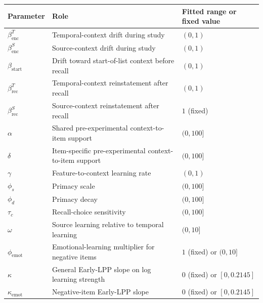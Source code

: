 \documentclass[
  man,
  longtable,
  nolmodern,
  notxfonts,
  notimes,
  draftfirst,
  colorlinks=true,linkcolor=blue,citecolor=blue,urlcolor=blue]{apa7}
\begin{document}
\begin{table}

{\caption{{Parameters in the six-model
specification.}{\label{tbl-model-parameter-spec}}}
\vspace{-20pt}}

\begin{longtable}[]{@{}
  >{\raggedright\arraybackslash}p{}
  >{\raggedright\arraybackslash}p{}
  >{\raggedright\arraybackslash}p{}@{}}
\toprule\noalign{}
\begin{minipage}[b]{\linewidth}\raggedright
Parameter
\end{minipage} & \begin{minipage}[b]{\linewidth}\raggedright
Role
\end{minipage} & \begin{minipage}[b]{\linewidth}\raggedright
Fitted range or fixed value
\end{minipage} \\
\midrule\noalign{}
\endhead
\bottomrule\noalign{}
\endlastfoot
\(\beta_{\mathrm{enc}}^T\) & Temporal-context drift during study &
\((0,1)\) \\
\(\beta_{\mathrm{enc}}^S\) & Source-context drift during study &
\((0,1)\) \\
\(\beta_{\mathrm{start}}\) & Drift toward start-of-list context before
recall & \((0,1)\) \\
\(\beta_{\mathrm{rec}}^T\) & Temporal-context reinstatement after recall
& \((0,1)\) \\
\(\beta_{\mathrm{rec}}^S\) & Source-context reinstatement after recall &
\(1\) (fixed) \\
\(\alpha\) & Shared pre-experimental context-to-item support &
\((0,100]\) \\
\(\delta\) & Item-specific pre-experimental context-to-item support &
\((0,100]\) \\
\(\gamma\) & Feature-to-context learning rate & \((0,1)\) \\
\(\phi_s\) & Primacy scale & \((0,100]\) \\
\(\phi_d\) & Primacy decay & \((0,100]\) \\
\(\tau_c\) & Recall-choice sensitivity & \((0,100]\) \\
\(\omega\) & Source learning relative to temporal learning &
\((0,10]\) \\
\(\phi_{\mathrm{emot}}\) & Emotional-learning multiplier for negative
items & \(1\) (fixed) or \((0,10]\) \\
\(\kappa\) & General Early-LPP slope on log learning strength & \(0\)
(fixed) or \([0,0.2145]\) \\
\(\kappa_{\mathrm{emot}}\) & Negative-item Early-LPP slope & \(0\)
(fixed) or \([0,0.2145]\) \\
\end{longtable}

\end{table}
\end{document}
